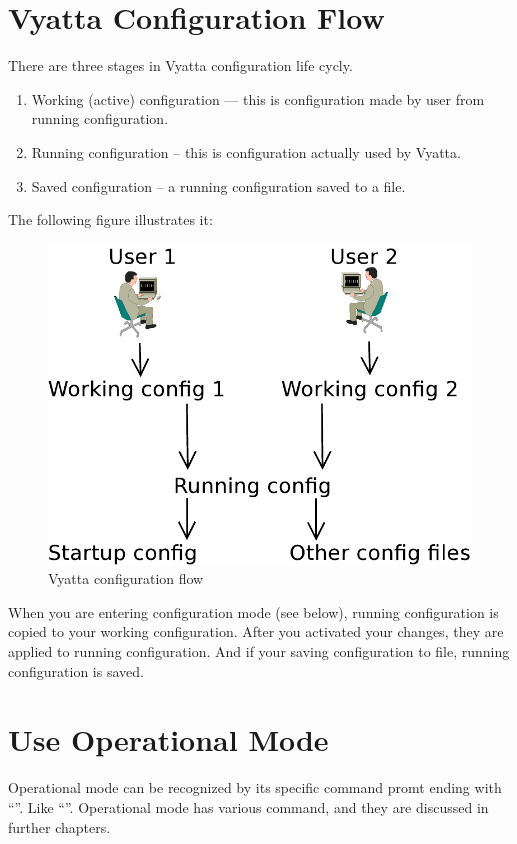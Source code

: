 \section{Vyatta Configuration Flow}
There are three stages in Vyatta configuration life cycly.
\begin{enumerate}
 \item Working (active) configuration --- this is configuration made by user from running configuration.
 \item Running configuration -- this is configuration actually used by Vyatta.
 \item Saved configuration -- a running configuration saved to a file.
\end{enumerate}
The following figure illustrates it:
\begin{figure}[hc]
 \begin{center}
   \includegraphics[width=\textwidth]{images/configuration_flow}
   \caption{Vyatta configuration flow}
  \end{center}
\end{figure}

When you are entering configuration mode (see below), running configuration is copied to your working
configuration. After you activated your changes, they are applied to running configuration. And if your
saving configuration to file, running configuration is saved.

\section{Use Operational Mode}
Operational mode can be recognized by its specific command promt ending with ``\console{\$}''.
Like ``''. Operational mode has various command, and they are discussed in further
chapters.

